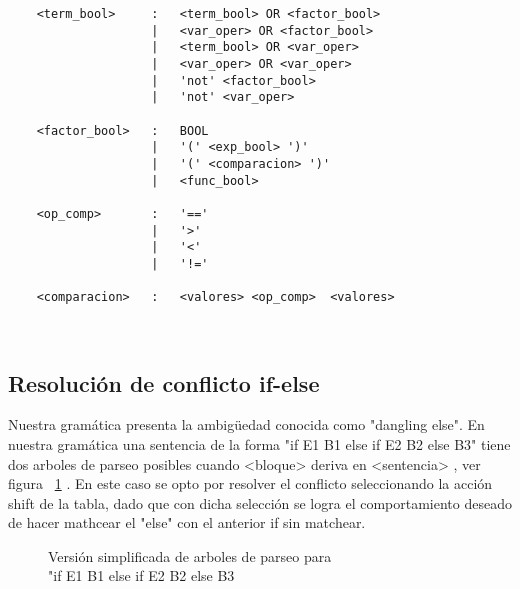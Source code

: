 \begin{verbatim}
    <term_bool>     :   <term_bool> OR <factor_bool>
                    |   <var_oper> OR <factor_bool>
                    |   <term_bool> OR <var_oper>
                    |   <var_oper> OR <var_oper>
                    |   'not' <factor_bool>
                    |   'not' <var_oper>

    <factor_bool>   :   BOOL
                    |   '(' <exp_bool> ')'
                    |   '(' <comparacion> ')'
                    |   <func_bool>

    <op_comp>       :   '=='
                    |   '>'
                    |   '<'
                    |   '!='

    <comparacion>   :   <valores> <op_comp>  <valores>

    
\end{verbatim}
\subsection{Resolución de conflicto if-else}\label{sec:pgram}
Nuestra gramática presenta la ambigüedad conocida como "dangling else". En nuestra gramática una sentencia de la forma "if E1 B1 else if E2 B2 else B3" tiene dos arboles de parseo posibles cuando <bloque> deriva en <sentencia> , ver figura ~\ref{fig:trees} .  En este caso se opto por resolver el conflicto seleccionando la acción shift de la tabla, dado que con dicha selección se logra el comportamiento deseado de hacer mathcear el "else" con el anterior if sin matchear.  

\begin{figure}[H]

    \begin{subfigure}[b]{0.3\textwidth}
    \end{subfigure}
    
    \begin{subfigure}[b]{0.3\textwidth}
    \end{subfigure}
    



     \caption{Versión simplificada de arboles de parseo para \\"if E1 B1 else if E2 B2 else B3 }
      \label{fig:trees}
\end{figure}    
